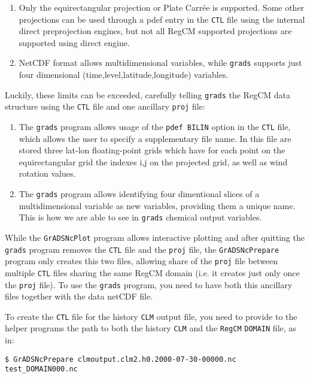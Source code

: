 \begin{enumerate}
\item Only the equirectangular projection or Plate Carr\'ee is supported. Some
other projections can be used through a pdef entry in the \verb=CTL= file
using the internal direct preprojection engines, but not all RegCM supported
projections are supported using direct engine.
\item NetCDF format allows multidimensional variables, while \verb=grads=
supports just four dimensional (time,level,latitude,longitude) variables.
\end{enumerate}

Luckily, these limits can be exceeded, carefully telling \verb=grads= the
RegCM data structure using the \verb=CTL= file and one ancillary \verb=proj=
file:

\begin{enumerate}
\item The \verb=grads= program allows usage of the \verb=pdef BILIN= option
in the \verb=CTL= file, which allows the user to specify a supplementary file
name. In this file are stored three lat-lon floating-point grids which have
for each point on the equirectangular grid the indexes i,j on the projected
grid, as well as wind rotation values.
\item The \verb=grads= program allows identifying four dimentional slices of
a multidimensional variable as new variables, providing them a unique name.
This is how we are able to see in \verb=grads= chemical output variables.
\end{enumerate}

While the \verb=GrADSNcPlot= program allows interactive plotting and after
quitting the \verb=grads= program removes the \verb=CTL= file and the
\verb=proj= file, the \verb=GrADSNcPrepare= program only creates this two
files, allowing share of the \verb=proj= file between multiple \verb=CTL=
files sharing the same RegCM domain (i.e. it creates just only once the
\verb=proj= file). To use the \verb=grads= program, you need to have both
this ancillary files together with the data netCDF file.

To create the \verb=CTL= file for the history \verb=CLM= output file, you need
to provide to the helper programs the path to both the history \verb=CLM= and
the \verb=RegCM= \verb=DOMAIN= file, as in:

\begin{Verbatim}
$ GrADSNcPrepare clmoutput.clm2.h0.2000-07-30-00000.nc test_DOMAIN000.nc
\end{Verbatim}

